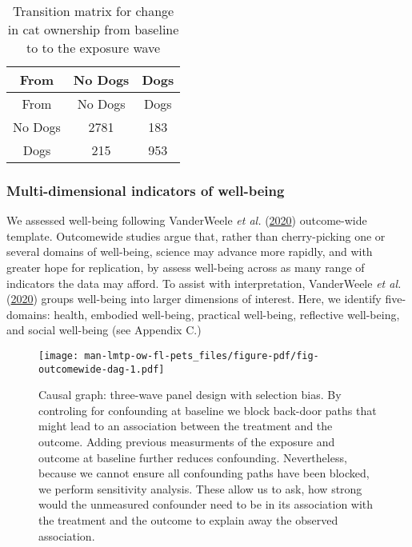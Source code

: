 \documentclass[
  singlecolumn,
  9pt]{article}
\begin{document}
\hypertarget{tbl-transition-dogs}{}
\begin{longtable}[]{@{}ccc@{}}
\caption{\label{tbl-transition-dogs}Transition matrix for change in cat
ownership from baseline to to the exposure wave}\tabularnewline
\toprule\noalign{}
From & No Dogs & Dogs \\
\midrule\noalign{}
\endfirsthead
\toprule\noalign{}
From & No Dogs & Dogs \\
\midrule\noalign{}
\endhead
\bottomrule\noalign{}
\endlastfoot
No Dogs & 2781 & 183 \\
Dogs & 215 & 953 \\
\end{longtable}

\subsubsection{Multi-dimensional indicators of
well-being}\label{multi-dimensional-indicators-of-well-being}

We assessed well-being following VanderWeele \emph{et al.}
(\hyperref[ref-vanderweele2020]{2020}) outcome-wide template.
Outcomewide studies argue that, rather than cherry-picking one or
several domains of well-being, science may advance more rapidly, and
with greater hope for replication, by assess well-being across as many
range of indicators the data may afford. To assist with interpretation,
VanderWeele \emph{et al.} (\hyperref[ref-vanderweele2020]{2020}) groups
well-being into larger dimensions of interest. Here, we identify
five-domains: health, embodied well-being, practical well-being,
reflective well-being, and social well-being (see Appendix C.)

\newpage{}

\begin{figure}

{\centering \texttt{[image: man-lmtp-ow-fl-pets\_files/figure-pdf/fig-outcomewide-dag-1.pdf]}

}

\caption{\label{fig-outcomewide-dag}Causal graph: three-wave panel
design with selection bias. By controling for confounding at baseline we
block back-door paths that might lead to an association between the
treatment and the outcome. Adding previous measurments of the exposure
and outcome at baseline further reduces confounding. Nevertheless,
because we cannot ensure all confounding paths have been blocked, we
perform sensitivity analysis. These allow us to ask, how strong would
the unmeasured confounder need to be in its association with the
treatment and the outcome to explain away the observed association.}

\end{figure}
\end{document}
